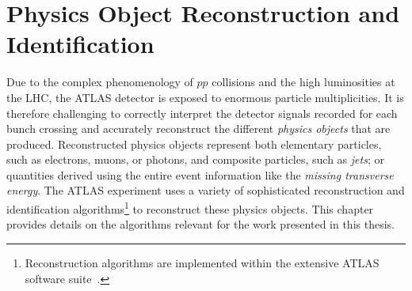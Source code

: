 
\chapter{Physics Object Reconstruction and Identification}
\label{chap:objects}

Due to the complex phenomenology of $pp$ collisions and the high luminosities at the LHC, the ATLAS detector is exposed to enormous particle multiplicities. It is therefore challenging to correctly interpret the detector signals recorded for each bunch crossing and accurately reconstruct the different \emph{physics objects} that are produced.
Reconstructed physics objects represent both elementary particles, such as electrons, muons, or photons, and composite particles, such as \emph{jets}; or quantities derived using the entire event information like the \emph{missing transverse energy}.
The ATLAS experiment uses a variety of sophisticated reconstruction and identification algorithms\footnote{Reconstruction algorithms are implemented within the extensive ATLAS software suite~\cite{ATL-SOFT-PUB-2021-001}.} to reconstruct these physics objects.
This chapter provides details on the algorithms relevant for the work presented in this thesis.






